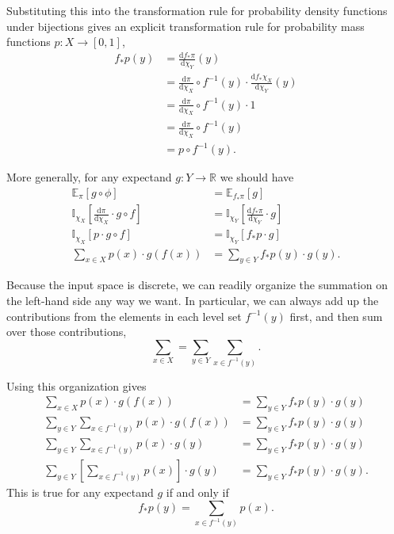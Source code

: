 \documentclass[
  letterpaper,
  DIV=11,
  numbers=noendperiod]{scrartcl}
\begin{document}
Substituting this into the transformation rule for probability density
functions under bijections gives an explicit transformation rule for
probability mass functions \(p : X \rightarrow [0, 1]\), \begin{align*}
f_{*} p(y)
&=
\frac{ \mathrm{d} f_{*} \pi }{ \mathrm{d} \chi_{Y} }(y)
\\
&=
\frac{ \mathrm{d} \pi }{ \mathrm{d} \chi_{X} } \circ f^{-1}(y)
\cdot
\frac{ \mathrm{d} f_{*} \chi_{X} }{ \mathrm{d} \chi_{Y} }(y)
\\
&=
\frac{ \mathrm{d} \pi }{ \mathrm{d} \chi_{X} } \circ f^{-1}(y)
\cdot
1
\\
&=
\frac{ \mathrm{d} \pi }{ \mathrm{d} \chi_{X} } \circ f^{-1}(y)
\\
&=
p \circ f^{-1}(y).
\end{align*}

More generally, for any expectand \(g : Y \rightarrow \mathbb{R}\) we
should have \begin{align*}
\mathbb{E}_{\pi}[g \circ \phi]
&=
\mathbb{E}_{f_{*} \pi}[g]
\\
\mathbb{I}_{ \chi_{X} }
\left[
  \frac{ \mathrm{d} \pi }{ \mathrm{d} \chi_{X} } \cdot g \circ f
\right]
&=
\mathbb{I}_{ \chi_{Y} }
\left[
  \frac{ \mathrm{d} f_{*} \pi }{ \mathrm{d} \chi_{Y}} \cdot g
\right]
\\
\mathbb{I}_{ \chi_{X} }
\left[ p \cdot g \circ f \right]
&=
\mathbb{I}_{ \chi_{Y} }
\left[ f_{*} p \cdot g \right]
\\
\sum_{x \in X} p(x) \cdot g(f(x))
&=
\sum_{y \in Y} f_{*} p(y) \cdot g(y).
\end{align*}

Because the input space is discrete, we can readily organize the
summation on the left-hand side any way we want. In particular, we can
always add up the contributions from the elements in each level set
\(f^{-1}( y )\) first, and then sum over those contributions, \[
\sum_{x \in X} = \sum_{y \in Y} \sum_{x \in f^{-1}(y)}.
\]

Using this organization gives \begin{align*}
\sum_{x \in X} p(x) \cdot g(f(x))
&=
\sum_{y \in Y} f_{*} p(y) \cdot g(y)
\\
\sum_{y \in Y} \sum_{x \in f^{-1}(y)} p(x) \cdot g(f(x))
&=
\sum_{y \in Y} f_{*} p(y) \cdot g(y)
\\
\sum_{y \in Y} \sum_{x \in f^{-1}(y)} p(x) \cdot g(y)
&=
\sum_{y \in Y} f_{*} p(y) \cdot g(y)
\\
\sum_{y \in Y} \left[ \sum_{x \in f^{-1}(y)} p(x) \right] \cdot g(y)
&=
\sum_{y \in Y} f_{*} p(y) \cdot g(y).
\end{align*} This is true for any expectand \(g\) if and only if \[
f_{*} p(y) = \sum_{x \in f^{-1}(y)} p(x).
\]
\end{document}
